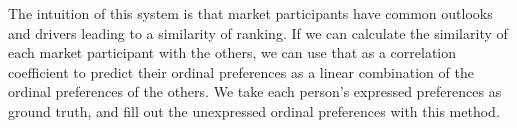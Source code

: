 The intuition of this system is that market participants have common outlooks and drivers leading to a similarity of ranking. If we can calculate the similarity of each market participant with the others, we can use that as a correlation coefficient to predict their ordinal preferences as a linear combination of the ordinal preferences of the others. We take each person's expressed preferences as ground truth, and fill out the unexpressed ordinal preferences with this method.